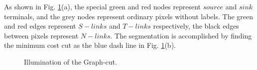\documentclass[journal]{IEEEtran}
\begin{document}
As shown in Fig. \ref{fig:graphcut}(a), the special green and red nodes represent $source$ and $sink$ terminals, and the grey nodes represent ordinary pixels without labels. The green and red edges represent $S-links$ and $T-links$ respectively, the black edges between pixels represent $N-links$. The segmentation is accomplished by finding the minimum cost cut as the blue dash line in Fig. \ref{fig:graphcut}(b).\par
\begin{figure}[!t]
	\centering
	\caption{Illumination of the Graph-cut.}
	\label{fig:graphcut}
\end{figure}

\end{document}
